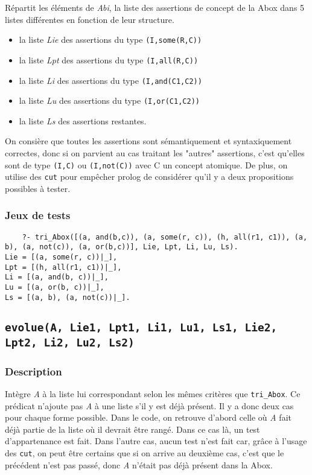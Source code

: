 \documentclass{article}
\newcommand{\code}[1]{\colorbox{light-gray}{\texttt{#1}}}
\begin{document}
Répartit les éléments de \textit{Abi}, la liste des assertions de concept de la Abox dans 5 listes différentes en fonction de leur structure. 
\begin{itemize}
    \item la liste \textit{Lie} des assertions du type \code{(I,some(R,C))}
    \item la liste \textit{Lpt} des assertions du type \code{(I,all(R,C))}
    \item la liste \textit{Li} des assertions du type \code{(I,and(C1,C2))}
    \item la liste \textit{Lu} des assertions du type \code{(I,or(C1,C2))}
    \item la liste \textit{Ls} des assertions restantes.
\end{itemize}
 On consière que toutes les assertions sont sémantiquement et syntaxiquement correctes, donc si on parvient au cas traitant les "autres" assertions, c'est qu'elles sont de type \code{(I,C)} ou \code{(I,not(C))} avec C un concept atomique. De plus, on utilise des \code{cut} pour empêcher prolog de considérer qu'il y a deux propositions possibles à tester.
\subsubsection{Jeux de tests}
\begin{verbatim}
    ?- tri_Abox([(a, and(b,c)), (a, some(r, c)), (h, all(r1, c1)), (a, b), (a, not(c)), (a, or(b,c))], Lie, Lpt, Li, Lu, Ls).
Lie = [(a, some(r, c))|_],
Lpt = [(h, all(r1, c1))|_],
Li = [(a, and(b, c))|_],
Lu = [(a, or(b, c))|_],
Ls = [(a, b), (a, not(c))|_].
\end{verbatim}

\subsection{\code{evolue(A, Lie1, Lpt1, Li1, Lu1, Ls1, Lie2, Lpt2, Li2, Lu2, Ls2)}}

\subsubsection{Description}
Intègre \textit{A} à la liste lui correspondant selon les mêmes critères que \code{tri\_Abox}. Ce prédicat n'ajoute pas \textit{A} à une liste s'il y est déjà présent. Il y a donc deux cas pour chaque forme possible. Dans le code, on retrouve d'abord celle où \textit{A} fait déjà partie de la liste où il devrait être rangé. Dans ce  cas là, un test d'appartenance est fait. Dans l'autre cas, aucun test n'est fait car, grâce à l'usage des \code{cut}, on peut être certains que si on arrive au deuxième cas, c'est que le précédent n'est pas passé, donc \textit{A} n'était pas déjà présent dans la Abox.
\end{document}
